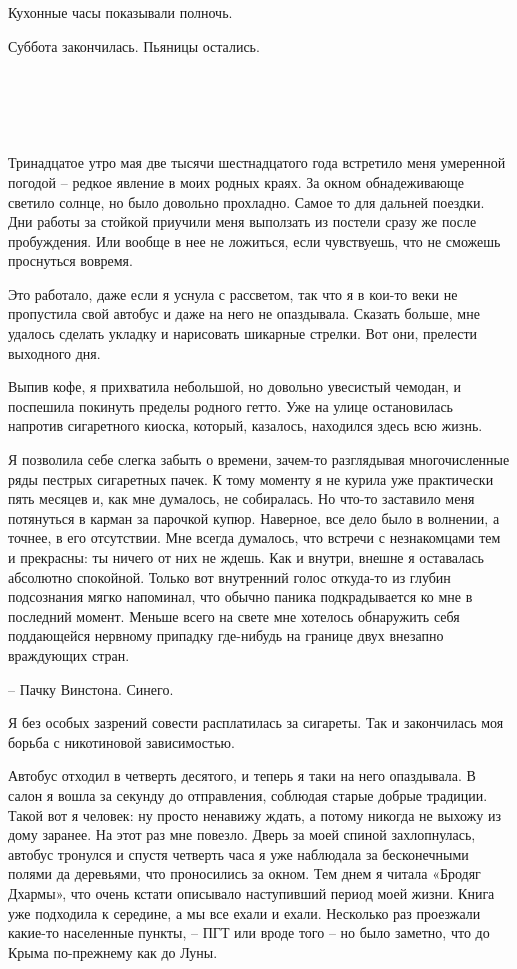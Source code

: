 \documentclass[
]{book}
\begin{document}
Кухонные часы показывали полночь.

Суббота закончилась. Пьяницы остались.

\hypertarget{chapter-4}{%
\chapter{~}\label{chapter-4}}

Тринадцатое утро мая две тысячи шестнадцатого года встретило меня умеренной погодой -- редкое явление в моих родных краях. За окном обнадеживающе светило солнце, но было довольно прохладно. Самое то для дальней поездки. Дни работы за стойкой приучили меня выползать из постели сразу же после пробуждения. Или вообще в нее не ложиться, если чувствуешь, что не сможешь проснуться вовремя.

Это работало, даже если я уснула с рассветом, так что я в кои-то веки не пропустила свой автобус и даже на него не опаздывала. Сказать больше, мне удалось сделать укладку и нарисовать шикарные стрелки. Вот они, прелести выходного дня.

Выпив кофе, я прихватила небольшой, но довольно увесистый чемодан, и поспешила покинуть пределы родного гетто. Уже на улице остановилась напротив сигаретного киоска, который, казалось, находился здесь всю жизнь.

Я позволила себе слегка забыть о времени, зачем-то разглядывая многочисленные ряды пестрых сигаретных пачек. К тому моменту я не курила уже практически пять месяцев и, как мне думалось, не собиралась. Но что-то заставило меня потянуться в карман за парочкой купюр. Наверное, все дело было в волнении, а точнее, в его отсутствии. Мне всегда думалось, что встречи с незнакомцами тем и прекрасны: ты ничего от них не ждешь. Как и внутри, внешне я оставалась абсолютно спокойной. Только вот внутренний голос откуда-то из глубин подсознания мягко напоминал, что обычно паника подкрадывается ко мне в последний момент. Меньше всего на свете мне хотелось обнаружить себя поддающейся нервному припадку где-нибудь на границе двух внезапно враждующих стран.

-- Пачку Винстона. Синего.

Я без особых зазрений совести расплатилась за сигареты. Так и закончилась моя борьба с никотиновой зависимостью.

Автобус отходил в четверть десятого, и теперь я таки на него опаздывала. В салон я вошла за секунду до отправления, соблюдая старые добрые традиции. Такой вот я человек: ну просто ненавижу ждать, а потому никогда не выхожу из дому заранее. На этот раз мне повезло. Дверь за моей спиной захлопнулась, автобус тронулся и спустя четверть часа я уже наблюдала за бесконечными полями да деревьями, что проносились за окном. Тем днем я читала «Бродяг Дхармы», что очень кстати описывало наступивший период моей жизни. Книга уже подходила к середине, а мы все ехали и ехали. Несколько раз проезжали какие-то населенные пункты, -- ПГТ или вроде того -- но было заметно, что до Крыма по-прежнему как до Луны.
\end{document}
